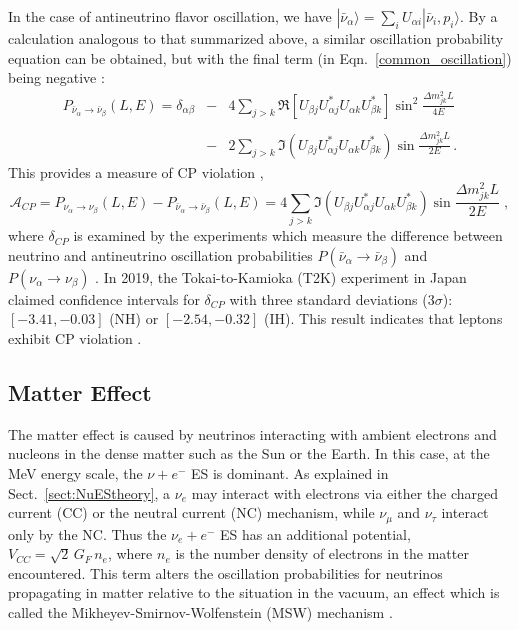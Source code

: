 In the case of antineutrino flavor oscillation, we have $|\bar{\nu}_\alpha\rangle=\sum_i U_{\alpha i}|\bar{\nu}_i,p_i\rangle$. By a calculation analogous to that summarized above, a similar oscillation probability equation can be obtained, but with the final term (in Eqn.~\ref{common_oscillation}) being negative \cite{aitchison2012gauge}:
\begin{eqnarray}\label{antiNu_eq1}
P_{\bar{\nu}_\alpha\to\bar{\nu}_\beta}(L,E)=\delta_{\alpha\beta} &-& 4\sum_{j>k} \Re[U_{\beta j}U^*_{\alpha j}U_{\alpha k}U^*_{\beta k}]\sin^2\frac{\Delta m^2_{jk}L}{4E} \nonumber\\
&\;& \\
&-& 2\sum_{j>k} \Im(U_{\beta j}U^*_{\alpha j}U_{\alpha k}U^*_{\beta k})\sin\frac{\Delta m^2_{jk}L}{2E} \nonumber \, .
\end{eqnarray}
This provides a measure of CP violation \cite{aitchison2012gauge},
\begin{equation}\label{cpV_eq1}
\mathcal{A}_{CP}=P_{\nu_\alpha\to\nu_\beta}(L,E)-P_{\bar{\nu}_\alpha\to\bar{\nu}_\beta}(L,E)=
4\sum_{j>k} \Im(U_{\beta j}U^*_{\alpha j}U_{\alpha k}U^*_{\beta k})\sin\frac{\Delta m^2_{jk}L}{2E} \;,
\end{equation}
where $\delta_{CP}$ is examined by the experiments which measure the difference between neutrino and antineutrino oscillation probabilities $P(\bar{\nu}_\alpha\to\bar{\nu}_\beta)$ and $P(\nu_\alpha\to\nu_\beta)$ \cite{xing2011neutrinos}. In 2019, the Tokai-to-Kamioka (T2K) experiment in Japan claimed confidence intervals for $\delta_{CP}$ with three standard deviations ($3\sigma$): $[-3.41,-0.03]$ (NH) or $[-2.54,-0.32]$ (IH). This result indicates that leptons exhibit CP violation \cite{abe2019constraint}.

\subsection{Matter Effect}\label{sect:MSW}

The matter effect is caused by neutrinos interacting with ambient electrons and nucleons in the dense matter such as the Sun or the Earth. In this case, at the MeV energy scale, the $\nu+e^-$ ES is dominant. As explained in Sect.~\ref{sect:NuEStheory}, a $\nu_e$ may interact with electrons via either the charged current (CC) or the neutral current (NC) mechanism, while $\nu_\mu$ and $\nu_\tau$ interact only by the NC. Thus the $\nu_e+e^-$ ES has an additional potential, $V_{CC} =\sqrt{2} \, G_F \, n_e$, where $n_e$ is the number density of electrons in the matter encountered. This term alters the oscillation probabilities for neutrinos propagating in matter relative to the situation in the vacuum, an effect which is called the Mikheyev-Smirnov-Wolfenstein (MSW) mechanism \cite{smirnov2016solar,smirnov2005msw}.

